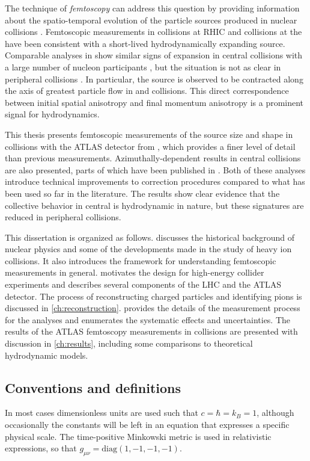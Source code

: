 The technique of \emph{femtoscopy} can address this question by providing information about the spatio-temporal evolution of the particle sources produced in nuclear collisions \cite{Lisa:2005dd}.
Femtoscopic measurements in \AuAu collisions at \ac{RHIC} and \PbPb collisions at the \lhc have been consistent with a short-lived hydrodynamically expanding source.
Comparable analyses in \pPb show similar signs of expansion in central collisions with a large number of nucleon participants \Npart, but the situation is not as clear in peripheral collisions \cite{Abelev:2014pja,Adam:2015pya}.
In particular, the source is observed to be contracted along the axis of greatest particle flow in \AuAu \cite{Adams:2003ra,Adare:2014vax,Adamczyk:2014mxp} and \PbPb \cite{Adamova:2017opl} collisions.
This direct correspondence between initial spatial anisotropy and final momentum anisotropy is a prominent signal for hydrodynamics.

This thesis presents femtoscopic measurements of the source size and shape in \pPb collisions with the ATLAS detector from , which provides a finer level of detail than previous measurements.
Azimuthally-dependent results in central \pPb collisions are also presented, parts of which have been published in .
Both of these analyses introduce technical improvements to correction procedures compared to what has been used so far in the literature.
The results show clear evidence that the collective behavior in central \pPb is hydrodynamic in nature, but these signatures are reduced in peripheral collisions.

This dissertation is organized as follows.
 discusses the historical background of nuclear physics and some of the developments made in the study of heavy ion collisions.
It also introduces the framework for understanding femtoscopic measurements in general.
 motivates the design for high-energy collider experiments and describes several components of the \ac{LHC} and the ATLAS detector.
The process of reconstructing charged particles and identifying pions is discussed in \cref{ch:reconstruction}.
 provides the details of the measurement process for the analyses and enumerates the systematic effects and uncertainties.
The results of the ATLAS femtoscopy measurements in \pPb collisions are presented with discussion in \cref{ch:results}, including some comparisons to theoretical hydrodynamic models.

\subsection*{Conventions and definitions}
In most cases dimensionless units are used such that $c = \hbar = k_B = 1$, although occasionally the constants will be left in an equation that expresses a specific physical scale.
The time-positive Minkowski metric is used in relativistic expressions, so that $g_{\mu\nu} = \mathrm{diag}\left( 1, -1, -1, -1\right)$.

